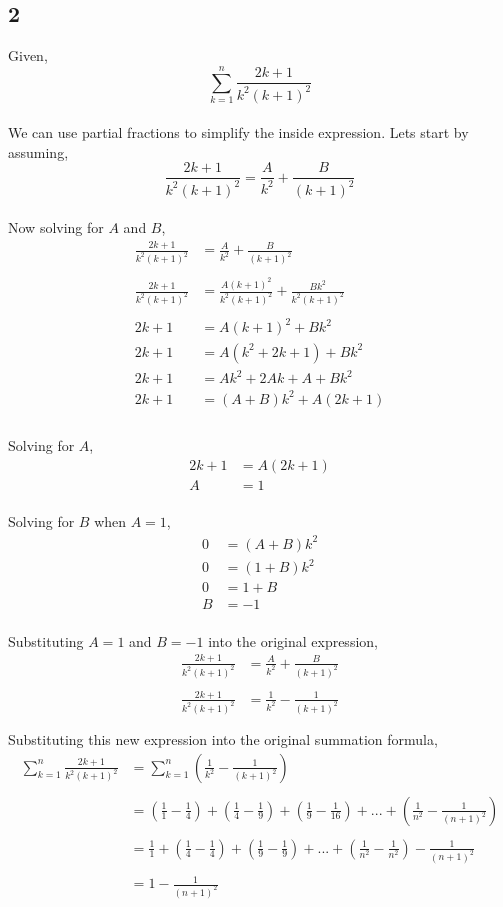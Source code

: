 \documentclass[12pt]{article}
\begin{document}
\subsection*{2}
Given,
$$\sum_{k=1}^{n} \frac{2k+1}{k^2(k+1)^2}$$
\\
We can use partial fractions to simplify the inside expression. Lets start by assuming,
$$\frac{2k+1}{k^2(k+1)^2} = \frac{A}{k^2} + \frac{B}{(k+1)^2}$$
\\
Now solving for $A$ and $B$,
\begin{align*}
  \frac{2k+1}{k^2(k+1)^2} &= \frac{A}{k^2} + \frac{B}{(k+1)^2}\\ \\
  \frac{2k+1}{k^2(k+1)^2} &= \frac{A(k+1)^2}{k^2(k+1)^2} + \frac{Bk^2}{k^2(k+1)^2}\\ \\
  2k+1 &= A(k+1)^2 + Bk^2\\
  2k+1 &= A(k^2+2k+1) + Bk^2\\
  2k+1 &= Ak^2+2Ak+A + Bk^2\\
  2k+1 &= (A+B)k^2+A(2k+1)\\
\end{align*}
\\
Solving for $A$,
\begin{align*}
  2k+1 &= A(2k+1) \\
  A &= 1
\end{align*}
\\
Solving for $B$ when $A=1$,
\begin{align*}
  0 &= (A+B)k^2 \\
  0 &= (1+B)k^2 \\
  0 &= 1+B \\
  B &= -1
\end{align*}
\\
Substituting $A=1$ and $B=-1$ into the original expression,
\begin{align*}
  \frac{2k+1}{k^2(k+1)^2} &= \frac{A}{k^2} + \frac{B}{(k+1)^2} \\ \\
  \frac{2k+1}{k^2(k+1)^2} &= \frac{1}{k^2} - \frac{1}{(k+1)^2} \\ \\
\end{align*}
Substituting this new expression into the original summation formula,
\begin{align*}
  \sum_{k=1}^{n} \frac{2k+1}{k^2(k+1)^2} &= \sum_{k=1}^{n} \left( \frac{1}{k^2} - \frac{1}{(k+1)^2} \right) \\ \\
  &= \left( \frac{1}{1} - \frac{1}{4} \right) + \left( \frac{1}{4} - \frac{1}{9} \right) 
  + \left( \frac{1}{9} - \frac{1}{16} \right) +...+ \left( \frac{1}{n^2} - \frac{1}{(n+1)^2} \right) \\ \\
  &=  \frac{1}{1} + \left( \frac{1}{4} - \frac{1}{4} \right) + \left( \frac{1}{9} - \frac{1}{9} \right) +...
  + \left( \frac{1}{n^2} - \frac{1}{n^2} \right) - \frac{1}{(n+1)^2}\\ \\
  &= 1 - \frac{1}{(n+1)^2}
\end{align*}
\end{document}
